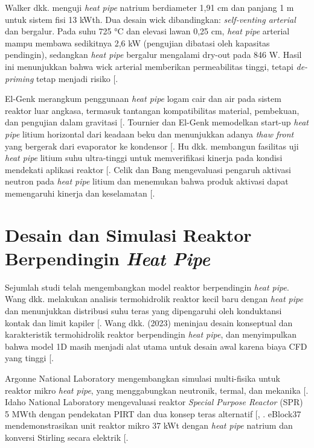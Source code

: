 \documentclass[
  indonesian,
  12pt,
  a4paper,
]{report}
\begin{document}
Walker dkk. menguji \emph{heat pipe} natrium berdiameter 1,91 cm dan
panjang 1 m untuk sistem fisi 13 kWth. Dua desain wick dibandingkan:
\emph{self-venting arterial} dan bergalur. Pada suhu 725 °C dan elevasi
lawan 0,25 cm, \emph{heat pipe} arterial mampu membawa sedikitnya 2,6 kW
(pengujian dibatasi oleh kapasitas pendingin), sedangkan \emph{heat
pipe} bergalur mengalami dry-out pada 846 W. Hasil ini menunjukkan bahwa
wick arterial memberikan permeabilitas tinggi, tetapi \emph{de-priming}
tetap menjadi risiko {[}\citeproc{ref-walker2013}{12}{]}.

El-Genk merangkum penggunaan \emph{heat pipe} logam cair dan air pada
sistem reaktor luar angkasa, termasuk tantangan kompatibilitas material,
pembekuan, dan pengujian dalam gravitasi
{[}\citeproc{ref-elgenk2011}{15}{]}. Tournier dan El-Genk memodelkan
start-up \emph{heat pipe} litium horizontal dari keadaan beku dan
menunjukkan adanya \emph{thaw front} yang bergerak dari evaporator ke
kondensor {[}\citeproc{ref-tournier2001}{16}{]}. Hu dkk. membangun
fasilitas uji \emph{heat pipe} litium suhu ultra-tinggi untuk
memverifikasi kinerja pada kondisi mendekati aplikasi reaktor
{[}\citeproc{ref-hu2022}{17}{]}. Celik dan Bang mengevaluasi pengaruh
aktivasi neutron pada \emph{heat pipe} litium dan menemukan bahwa produk
aktivasi dapat memengaruhi kinerja dan keselamatan
{[}\citeproc{ref-celik2023}{18}{]}.

\section{\texorpdfstring{Desain dan Simulasi Reaktor Berpendingin
\emph{Heat
Pipe}}{Desain dan Simulasi Reaktor Berpendingin Heat Pipe}}\label{desain-dan-simulasi-reaktor-berpendingin-heat-pipe}

Sejumlah studi telah mengembangkan model reaktor berpendingin \emph{heat
pipe}. Wang dkk. melakukan analisis termohidrolik reaktor kecil baru
dengan \emph{heat pipe} dan menunjukkan distribusi suhu teras yang
dipengaruhi oleh konduktansi kontak dan limit kapiler
{[}\citeproc{ref-wang2020}{19}{]}. Wang dkk. (2023) meninjau desain
konseptual dan karakteristik termohidrolik reaktor berpendingin
\emph{heat pipe}, dan menyimpulkan bahwa model 1D masih menjadi alat
utama untuk desain awal karena biaya CFD yang tinggi
{[}\citeproc{ref-wang2023}{20}{]}.

Argonne National Laboratory mengembangkan simulasi multi-fisika untuk
reaktor mikro \emph{heat pipe}, yang menggabungkan neutronik, termal,
dan mekanika {[}\citeproc{ref-anl2019}{21}{]}. Idaho National Laboratory
mengevaluasi reaktor \emph{Special Purpose Reactor} (SPR) 5 MWth dengan
pendekatan PIRT dan dua konsep teras alternatif
{[},
\citeproc{ref-sterbentz2017}{23}{]}. eBlock37 mendemonstrasikan unit
reaktor mikro 37 kWt dengan \emph{heat pipe} natrium dan konversi
Stirling secara elektrik {[}\citeproc{ref-gaspar2022}{24}{]}.
\end{document}
